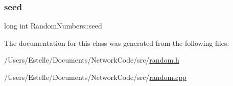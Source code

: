 \mbox{\label{classRandomNumbers_a83c563bc5ca60f2e5c149244b327d948}} 
\subsubsection{\texorpdfstring{seed}{seed}}
{\footnotesize\ttfamily long int Random\+Numbers\+::seed\hspace{0.3cm}{\ttfamily [private]}}



The documentation for this class was generated from the following files\+:\begin{DoxyCompactItemize}
\item 
/\+Users/\+Estelle/\+Documents/\+Network\+Code/src/\mbox{\hyperlink{random_8h}{random.\+h}}\item 
/\+Users/\+Estelle/\+Documents/\+Network\+Code/src/\mbox{\hyperlink{random_8cpp}{random.\+cpp}}\end{DoxyCompactItemize}
